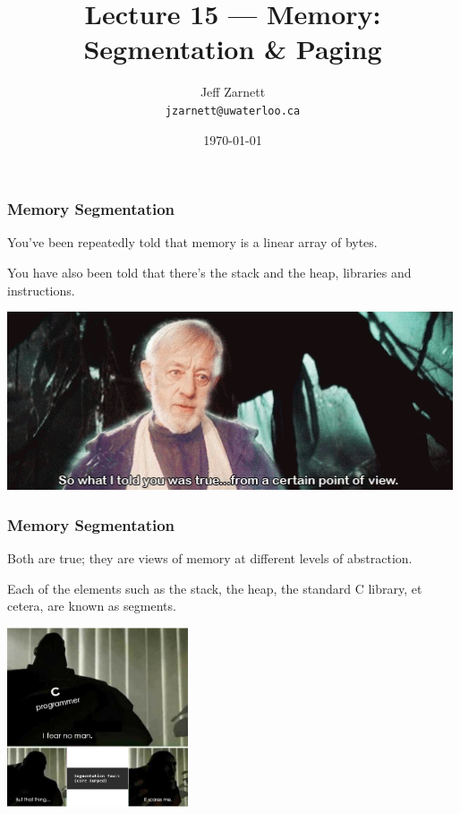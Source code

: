 

\title{Lecture 15 --- Memory: Segmentation \& Paging }

\author{Jeff Zarnett \\ \small \texttt{jzarnett@uwaterloo.ca}}
\date{\today}




\begin{frame}
  \titlepage

 \end{frame}



\begin{frame}
\frametitle{Memory Segmentation}

You've been repeatedly told that memory is a linear array of bytes. 

You have also been told that there's the stack and the heap, libraries and instructions.

\begin{center}
	\includegraphics[width=\textwidth]{images/pov.jpg}
\end{center}

 \end{frame}



\begin{frame}
\frametitle{Memory Segmentation}

Both are true; they are views of memory at different levels of abstraction. 

Each of the elements such as the stack, the heap, the standard C library, et cetera, are known as \alert{segments}.

\begin{center}
	\includegraphics[width=0.4\textwidth]{images/segfault.png}
\end{center}


\end{frame}

